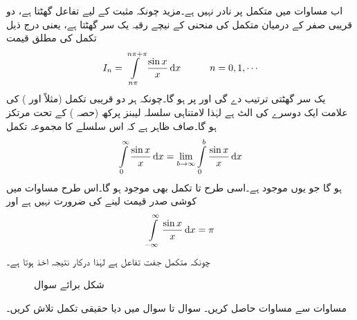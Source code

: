 اب مساوات  میں متکمل  پر نادر  نہیں ہے۔مزید چونکہ مثبت  کے لیے تفاعل  گھٹتا ہے، دو قریبی صفر کے درمیان متکمل کی منحنی کے نیچے رقبہ یک سر گھٹتا ہے، یعنی درج ذیل تکمل کی مطلق قیمت 
\begin{align*}
I_n=\int\limits_{n\pi}^{n\pi+\pi}\frac{\sin x}{x}\dif x\quad\quad \quad n=0,1,\cdots
\end{align*} 
یک سر گھٹتی ترتیب   دے گی اور  پر  ہو گا۔چونکہ ہر دو قریبی تکمل (مثلاً  اور ) کی علامت ایک دوسرے کی الٹ ہے  لہٰذا لامتناہی سلسلہ  لیبنز پرکھ (حصہ ) کے تحت مرتکز ہو گا۔صاف ظاہر ہے کہ اس سلسلے کا مجموعہ تکمل
\begin{align*}
\int\limits_0^{\infty} \frac{\sin x}{x}\dif x=\lim_{b\to \infty} \int\limits_{0}^{b}\frac{\sin x}{x}\dif x
\end{align*}
ہو گا جو یوں موجود ہے۔اسی طرح  تا  تکمل بھی موجود ہو گا۔اس طرح  مساوات  میں کوشی صدر قیمت لینے کی ضرورت نہیں ہے اور
\begin{align*}
\int\limits_{-\infty}^{\infty} \frac{\sin x}{x}\dif x=\pi
\end{align*}
چونکہ متکمل  جفت تفاعل ہے لہٰذا درکار نتیجہ اخذ ہوتا ہے۔
\begin{figure}
\centering
{}
\caption{شکل برائے سوال }
\label{شکل_سوال_بقیہ_کوشی_صدر_قیمت_دو_قطب}
\end{figure}
\quad
مساوات  سے مساوات  حاصل کریں۔
سوال  تا سوال  میں دیا حقیقی تکمل تلاش کریں۔

